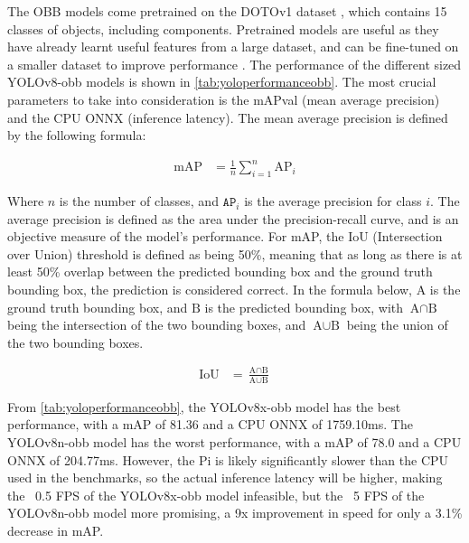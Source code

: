 The OBB models come pretrained on the DOTOv1 dataset \cite{9560031}, which contains 15 classes of objects, including components. Pretrained models are useful as they have already learnt useful features from a large dataset, and can be fine-tuned on a smaller dataset to improve performance \cite{pretrainedmodels}. The performance of the different sized YOLOv8-obb models is shown in \autoref{tab:yoloperformanceobb}. The most crucial parameters to take into consideration is the mAPval (mean average precision) and the CPU ONNX (inference latency). The mean average precision is defined by the following formula:

{\fontsize{14pt}{11pt}\selectfont
\begin{align*}
    \text{mAP} &= \frac{1}{n} \sum_{i=1}^{n} \text{AP}_i %
\end{align*}
}

Where $n$ is the number of classes, and $\texttt{AP}_i$ is the average precision for class $i$. The average precision is defined as the area under the precision-recall curve, and is an objective measure of the model's performance. For mAP, the IoU (Intersection over Union) threshold is defined as being 50\%, meaning that as long as there is at least 50\% overlap between the predicted bounding box and the ground truth bounding box, the prediction is considered correct. In the formula below, $\text{A}$ is the ground truth bounding box, and $\text{B}$ is the predicted bounding box, with $\text{A} \cap \text{B}$ being the intersection of the two bounding boxes, and $\text{A} \cup \text{B}$ being the union of the two bounding boxes.

{\fontsize{14pt}{11pt}\selectfont
\begin{align*}
    \text{IoU} &= \frac{\text{A} \cap \text{B}}{\text{A} \cup \text{B}} %
\end{align*}
}

From \autoref{tab:yoloperformanceobb}, the YOLOv8x-obb model has the best performance, with a mAP of 81.36 and a CPU ONNX of 1759.10ms. The YOLOv8n-obb model has the worst performance, with a mAP of 78.0 and a CPU ONNX of 204.77ms. However, the Pi is likely significantly slower than the CPU used in the benchmarks, so the actual inference latency will be higher, making the ~0.5 FPS of the YOLOv8x-obb model infeasible, but the ~5 FPS of the YOLOv8n-obb model more promising, a 9x improvement in speed for only a 3.1\% decrease in mAP. 

